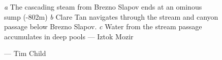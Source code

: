 \begin{figure}
      \checkoddpage \ifoddpage \forcerectofloat \else \forceversofloat \fi
      \centering
    \begin{subfigure}[t]{\textwidth}
    \centering
        \caption{} \label{Panorama}
    \end{subfigure}
    
          \vspace{0.3cm}
          
    \begin{subfigure}[t]{0.555\textwidth}
        \centering
        \caption{} \label{Will Scott bolting}
    \end{subfigure}
    \hfill
    \begin{subfigure}[t]{0.418\textwidth}
        \centering
        \caption{} \label{Ice}
    \end{subfigure}

    \caption{
    \emph{a} The cascading steam from Brezno Slapov ends at an ominous sump (-802m)
    \emph{b} Clare Tan navigates through the stream and canyon passage below Brezno Slapov.
    \emph{c} Water from the stream passage accumulates in deep pools --- Iztok Mozir }
\end{figure}

\begin{figure}[h!]
      \checkoddpage \ifoddpage \forcerectofloat \else \forceversofloat \fi
      \centering
       \label{Panorama}
  \caption{ --- Tim Child }
\end{figure}




\begin{figure}[t!]
\centering
{}
\caption{}
\label{}
\end{figure}

